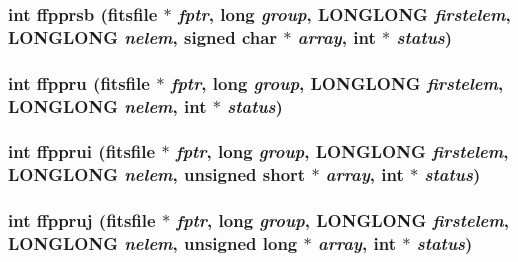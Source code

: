 \subsubsection{\setlength{\rightskip}{0pt plus 5cm}int ffpprsb (\bf{fitsfile} $\ast$ {\em fptr}, long {\em group}, \bf{LONGLONG} {\em firstelem}, \bf{LONGLONG} {\em nelem}, signed char $\ast$ {\em array}, int $\ast$ {\em status})}\label{test_2shm__client_2fitsio_8h_423d9ab6b05cb4a468f07ce5a7314597}


\subsubsection{\setlength{\rightskip}{0pt plus 5cm}int ffppru (\bf{fitsfile} $\ast$ {\em fptr}, long {\em group}, \bf{LONGLONG} {\em firstelem}, \bf{LONGLONG} {\em nelem}, int $\ast$ {\em status})}\label{test_2shm__client_2fitsio_8h_02bd28787c00e22132867eab898e1632}


\subsubsection{\setlength{\rightskip}{0pt plus 5cm}int ffpprui (\bf{fitsfile} $\ast$ {\em fptr}, long {\em group}, \bf{LONGLONG} {\em firstelem}, \bf{LONGLONG} {\em nelem}, unsigned short $\ast$ {\em array}, int $\ast$ {\em status})}\label{test_2shm__client_2fitsio_8h_bf984c3beeeb97131a4237a5ff8fb344}


\subsubsection{\setlength{\rightskip}{0pt plus 5cm}int ffppruj (\bf{fitsfile} $\ast$ {\em fptr}, long {\em group}, \bf{LONGLONG} {\em firstelem}, \bf{LONGLONG} {\em nelem}, unsigned long $\ast$ {\em array}, int $\ast$ {\em status})}\label{test_2shm__client_2fitsio_8h_4a659ff524a1a425fda4b2063373f848}


